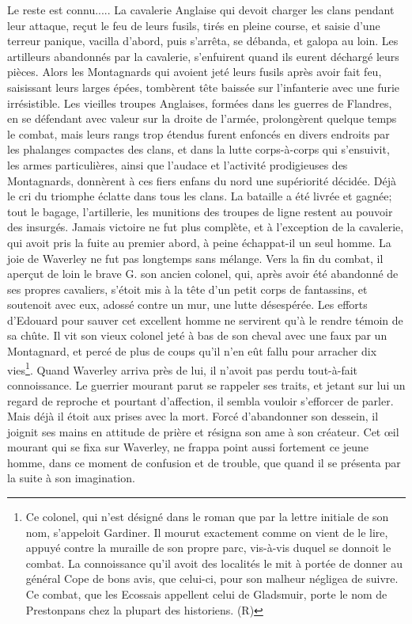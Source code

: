 Le reste est connu..... La cavalerie Anglaise qui devoit charger les clans pendant leur attaque, reçut le feu de leurs fusils, tirés en pleine course, et saisie d'une terreur panique, vacilla d'abord, puis s'arrêta, se débanda, et galopa au loin. Les artilleurs abandonnés par la cavalerie, s'enfuirent quand ils eurent déchargé leurs pièces. Alors les Montagnards qui avoient jeté leurs fusils après avoir fait feu, saisissant leurs larges épées, tombèrent tête baissée sur l'infanterie avec une furie irrésistible.
Les vieilles troupes Anglaises, formées dans les guerres de Flandres, en se défendant avec valeur sur la droite de l'armée, prolongèrent quelque temps le combat, mais leurs rangs trop étendus furent enfoncés en divers endroits par les phalanges compactes des clans, et dans la lutte corps-à-corps qui s'ensuivit, les armes particulières, ainsi que l'audace et l'activité prodigieuses des Montagnards, donnèrent à ces fiers enfans du nord une supériorité décidée.
Déjà le cri du triomphe éclatte dans tous\setcounter{page}{246} les clans. La bataille a été livrée et gagnée; tout le bagage, l'artillerie, les munitions des troupes de ligne restent au pouvoir des insurgés. Jamais victoire ne fut plus complète, et à l'exception de la cavalerie, qui avoit pris la fuite au premier abord, à peine échappat-il un seul homme.
La joie de Waverley ne fut pas longtemps sans mélange. Vers la fin du combat, il aperçut de loin le brave G. son ancien colonel, qui, après avoir été abandonné de ses propres cavaliers, s'étoit mis à la tête d'un petit corps de fantassins, et soutenoit avec eux, adossé contre un mur, une lutte désespérée. Les efforts d'Edouard pour sauver cet excellent homme ne servirent qu'à le rendre témoin de sa chûte. Il vit son vieux colonel jeté à bas de son cheval avec une faux par un Montagnard, et percé de plus de coups qu'il n'en eût fallu pour arracher dix vies\footnote{Ce colonel, qui n'est désigné dans le roman que par la lettre initiale de son nom, s'appeloit Gardiner. Il mourut exactement comme on vient de le lire, appuyé contre la muraille de son propre parc, vis-à-vis duquel se donnoit le combat. La connoissance qu'il avoit des localités le mit à portée de donner au général Cope de bons avis, que celui-ci, pour son malheur négligea de suivre. Ce combat, que les Ecossais appellent celui de Gladsmuir, porte le nom de Prestonpans chez la plupart des historiens. (R)}.\setcounter{page}{247} Quand Waverley arriva près de lui, il n'avoit pas perdu tout-à-fait connoissance. Le guerrier mourant parut se rappeler ses traits, et jetant sur lui un regard de reproche et pourtant d'affection, il sembla vouloir s'efforcer de parler. Mais déjà il étoit aux prises avec la mort. Forcé d'abandonner son dessein, il joignit ses mains en attitude de prière et résigna son ame à son créateur. Cet œil mourant qui se fixa sur Waverley, ne frappa point aussi fortement ce jeune homme, dans ce moment de confusion et de trouble, que quand il se présenta par la suite à son imagination.
